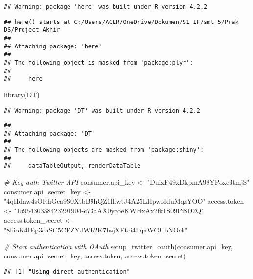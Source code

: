 \documentclass[
]{article}
\newenvironment{Shaded}{\begin{snugshade}}{\end{snugshade}}
\newcommand{\CommentTok}[1]{\textcolor[rgb]{0.56,0.35,0.01}{\textit{#1}}}
\newcommand{\FunctionTok}[1]{\textcolor[rgb]{0.00,0.00,0.00}{#1}}
\newcommand{\NormalTok}[1]{#1}
\newcommand{\OtherTok}[1]{\textcolor[rgb]{0.56,0.35,0.01}{#1}}
\newcommand{\StringTok}[1]{\textcolor[rgb]{0.31,0.60,0.02}{#1}}
\begin{document}
\begin{verbatim}
## Warning: package 'here' was built under R version 4.2.2
\end{verbatim}

\begin{verbatim}
## here() starts at C:/Users/ACER/OneDrive/Dokumen/S1 IF/smt 5/Prak DS/Project Akhir
## 
## Attaching package: 'here'
## 
## The following object is masked from 'package:plyr':
## 
##     here
\end{verbatim}

\begin{Shaded}
\begin{Highlighting}[]
\FunctionTok{library}\NormalTok{(DT)}
\end{Highlighting}
\end{Shaded}

\begin{verbatim}
## Warning: package 'DT' was built under R version 4.2.2
\end{verbatim}

\begin{verbatim}
## 
## Attaching package: 'DT'
## 
## The following objects are masked from 'package:shiny':
## 
##     dataTableOutput, renderDataTable
\end{verbatim}

\begin{Shaded}
\begin{Highlighting}[]
\CommentTok{\# Key auth Twitter API}
\NormalTok{consumer.api\_key }\OtherTok{\textless{}{-}} \StringTok{"DuixF49xDkpmA98YPoxe3tmjS"}
\NormalTok{consumer.api\_secret\_key }\OtherTok{\textless{}{-}} \StringTok{"4qHdnw4sORhGca9S0XtbB9hQZ1lliwtJ4A25LHpwoIduMqzYOO"}
\NormalTok{access.token }\OtherTok{\textless{}{-}} \StringTok{"1595430338423291904{-}c73aAX0ycoeKWHxAx2fk1S09Pi8D2Q"}
\NormalTok{access.token\_secret }\OtherTok{\textless{}{-}} \StringTok{"8kioK4IEp3oaSC5CFZYJWb2K7hsjXFtei4LqaWGUbNOck"}
  
\CommentTok{\# Start authentication with OAuth}
\FunctionTok{setup\_twitter\_oauth}\NormalTok{(consumer.api\_key, consumer.api\_secret\_key, access.token, access.token\_secret)}
\end{Highlighting}
\end{Shaded}

\begin{verbatim}
## [1] "Using direct authentication"
\end{verbatim}
\end{document}
